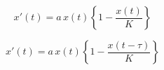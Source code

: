 $$
x'(t)=a \, x(t)\left\{1-\frac{x(t)}{K}\right\}
$$

$$
x'(t)=a \, x(t)\left\{1-\frac{x(t-\tau)}{K}\right\}
$$

